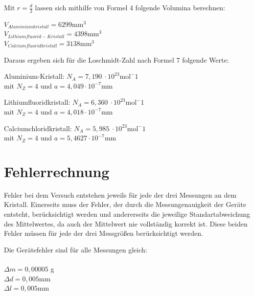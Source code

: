 \documentclass[12pt,a4paper,titlepage,headinclude,bibtotoc]{scrartcl}
\begin{document}
Mit $r=\frac{d}{2}$ lassen sich mithilfe von Formel 4 folgende Volumina berechnen:

\vspace{3mm}
$V_{Aluminiumkristall} = 6299 \mathrm{mm^3}$\\
$V_{Lithiumfluorid-Kristall} =4398 \mathrm{mm^3}$\\
$V_{Calciumfluoridkristall} = 3138 \mathrm{mm^3}$\\

\vspace{3mm}

Daraus ergeben sich für die Loschmidt-Zahl nach Formel 7 folgende Werte:
\vspace{3mm}

Aluminium-Kristall: \qquad $N_A = 7,190 \ \cdot 10^{23} \mathrm{mol^-1}$\\
mit $N_Z =4$ und $a=4,049\cdot 10^{-7} \mathrm{mm}$\\
\vspace{3mm}

Lithiumfluoridkristall: \qquad $N_A = 6,360 \ \cdot 10^{23} \mathrm{mol^-1}$\\
mit $N_Z =4$ und $a=4,018\cdot 10^{-7} \mathrm{mm}$\\
\vspace{3mm}

Calciumchloridkristall: \qquad $N_A = 5,985 \ \cdot 10^{23} \mathrm{mol^-1}$\\
mit $N_Z =4$ und $a=5,4627\cdot 10^{-7} \mathrm{mm}$\\
\vspace{3mm}


\section{Fehlerrechnung}
Fehler bei dem Versuch entstehen jeweils für jede der drei Messungen an dem Kristall. Einerseits muss der Fehler, der durch die Messungenauigkeit der Geräte entsteht, berücksichtigt werden und andererseits die jeweilige Standartabweichung des Mittelwertes, da auch der Mittelwert nie vollständig korrekt ist. Diese beiden Fehler müssen für jede der drei Messgrößen berücksichtigt werden.

Die Gerätefehler sind für alle Messungen gleich:
\\
\\
$\Delta m = 0,00005$ g \\
$\Delta d = 0,005$mm\\
$\Delta l = 0,005 $mm\\
\\
\end{document}
